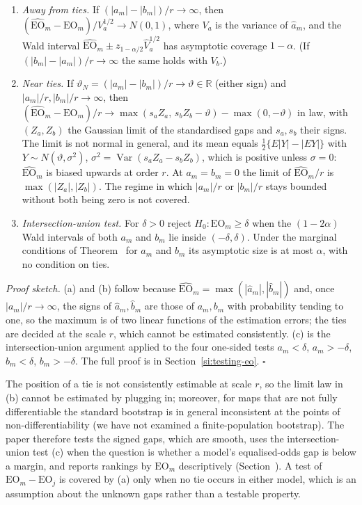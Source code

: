 \begin{proposition}\label{prop:eo}
\begin{enumerate}
\item[(a)] \emph{Away from ties.} If $(|a_m|-|b_m|)/r\to\infty$, then $(\widehat{\mathrm{EO}}_m-\mathrm{EO}_m)/V_{a}^{1/2}\to N(0,1)$, where $V_a$ is the variance of $\hat a_m$, and the Wald interval $\widehat{\mathrm{EO}}_m\pm z_{1-\alpha/2}\hat V_a^{1/2}$ has asymptotic coverage $1-\alpha$. (If $(|b_m|-|a_m|)/r\to\infty$ the same holds with $V_b$.)
\item[(b)] \emph{Near ties.} If $\vartheta_N=(|a_m|-|b_m|)/r\to\vartheta\in\mathbb R$ (either sign) and $|a_m|/r,|b_m|/r\to\infty$, then $(\widehat{\mathrm{EO}}_m-\mathrm{EO}_m)/r\to\max(s_aZ_a,\,s_bZ_b-\vartheta)-\max(0,-\vartheta)$ in law, with $(Z_a,Z_b)$ the Gaussian limit of the standardised gaps and $s_a,s_b$ their signs. The limit is not normal in general, and its mean equals $\tfrac12\{E|Y|-|EY|\}$ with $Y\sim N(\vartheta,\sigma^2)$, $\sigma^2=\operatorname{Var}(s_aZ_a-s_bZ_b)$, which is positive unless $\sigma=0$: $\widehat{\mathrm{EO}}_m$ is biased upwards at order $r$. At $a_m=b_m=0$ the limit of $\widehat{\mathrm{EO}}_m/r$ is $\max(|Z_a|,|Z_b|)$. The regime in which $|a_m|/r$ or $|b_m|/r$ stays bounded without both being zero is not covered.
\item[(c)] \emph{Intersection-union test.} For $\delta>0$ reject $H_0:\mathrm{EO}_m\ge\delta$ when the $(1-2\alpha)$ Wald intervals of both $a_m$ and $b_m$ lie inside $(-\delta,\delta)$. Under the marginal conditions of Theorem~ for $a_m$ and $b_m$ its asymptotic size is at most $\alpha$, with no condition on ties.
\end{enumerate}
\end{proposition}

\emph{Proof sketch.} (a) and (b) follow because $\widehat{\mathrm{EO}}_m=\max(|\hat a_m|,|\hat b_m|)$ and, once $|a_m|/r\to\infty$, the signs of $\hat a_m,\hat b_m$ are those of $a_m,b_m$ with probability tending to one, so the maximum is of two linear functions of the estimation errors; the ties are decided at the scale $r$, which cannot be estimated consistently. (c) is the intersection-union argument applied to the four one-sided tests $a_m<\delta$, $a_m>-\delta$, $b_m<\delta$, $b_m>-\delta$. The full proof is in Section~\ref{si:testing-eo}. $\square$

The position of a tie is not consistently estimable at scale $r$, so the limit law in (b) cannot be estimated by plugging in; moreover, for maps that are not fully differentiable the standard bootstrap is in general inconsistent at the points of non-differentiability \citep{fang2019} (we have not examined a finite-population bootstrap). The paper therefore tests the signed gaps, which are smooth, uses the intersection-union test (c) when the question is whether a model's equalised-odds gap is below a margin, and reports rankings by $\mathrm{EO}_m$ descriptively (Section~). A test of $\mathrm{EO}_m-\mathrm{EO}_j$ is covered by (a) only when no tie occurs in either model, which is an assumption about the unknown gaps rather than a testable property.

